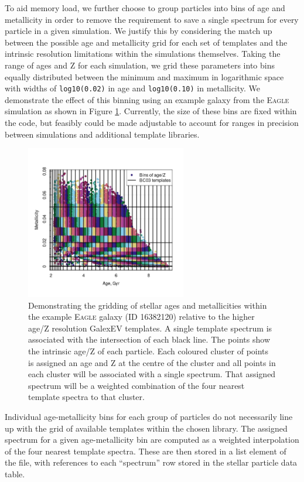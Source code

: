 \documentclass[
  journal=pasa,
  manuscript=research-paper, %
  year=2020,
  volume=37,
]{cup-journal}
\newcommand{\eagle}[1]{\textsc{Eagle}#1} %
\begin{document}
To aid memory load, we further choose to group particles into bins of age and metallicity in order to remove the requirement to save a single spectrum for every particle in a given simulation. 
We justify this by considering the match up between the possible age and metallicity grid for each set of templates and the intrinsic resolution limitations within the simulations themselves.
Taking the range of ages and Z for each simulation, we grid these parameters into bins equally distributed between the minimum and maximum in logarithmic space with widths of \texttt{log10(0.02)} in age and \texttt{log10(0.10)} in metallicity. 
We demonstrate the effect of this binning using an example galaxy from the \eagle{} simulation as shown in Figure \ref{fig:age_metal_bins}. 
Currently, the size of these bins are fixed within the code, but feasibly could be made adjustable to account for ranges in precision between simulations and additional template libraries. 

\begin{figure}
    \centering
    \includegraphics[keepaspectratio, width=7cm]{Figures/age_z_gridding_procedure.jpeg}
    \caption{Demonstrating the gridding of stellar ages and metallicities within the example \eagle{} galaxy (ID 16382120) relative to the higher age/Z resolution GalexEV templates. A single template spectrum is associated with the intersection of each black line. The points show the intrinsic age/Z of each particle. Each coloured cluster of points is assigned an age and Z at the centre of the cluster and all points in each cluster will be associated with a single spectrum. That assigned spectrum will be a weighted combination of the four nearest template spectra to that cluster.}
    \label{fig:age_metal_bins}
\end{figure}

Individual age-metallicity bins for each group of particles do not necessarily line up with the grid of available templates within the chosen library. 
The assigned spectrum for a given age-metallicity bin are computed as a weighted interpolation of the four nearest template spectra. 
These are then stored in a list element of the file, with references to each ``spectrum'' row stored in the stellar particle data table.
\end{document}
